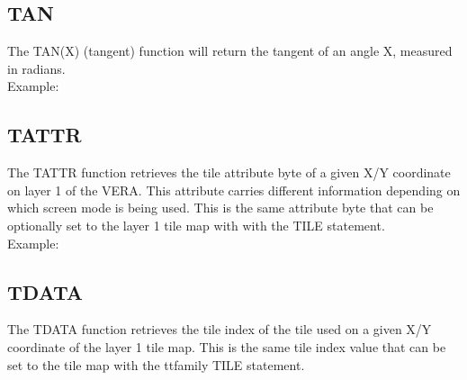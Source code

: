 
\subsection{TAN}

The {\ttfamily TAN(X)} (tangent) function will return the tangent of an angle
{\ttfamily X}, measured in radians.\\

Example:\\


\subsection{TATTR}

The {\ttfamily TATTR} function retrieves the tile attribute byte of a given X/Y
coordinate on layer 1 of the VERA.  This attribute carries different
information depending on which screen mode is being used.  This is the same
attribute byte that can be optionally set to the layer 1 tile map with with the
{\ttfamily TILE} statement.\\

Example:\\


\subsection{TDATA}

The {\ttfamily TDATA} function retrieves the tile index of the tile used on a
given X/Y coordinate of the layer 1 tile map.  This is the same tile index
value that can be set to the tile map with the {ttfamily TILE} statement.\\

